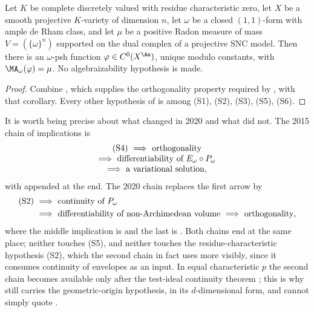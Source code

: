 \begin{corollary}
\label{cor:ch29-bggjkm-cy}
Let \(K\) be complete discretely valued with residue characteristic zero,
let \(X\) be a smooth projective \(K\)-variety of dimension \(n\), let
\(\omega\) be a closed \((1,1)\)-form with ample de Rham class, and let
\(\mu\) be a positive Radon measure of mass \(V=(\{\omega\}^n)\) supported
on the dual complex of a projective SNC model.  Then there is an
\(\omega\)-psh function \(\varphi\in C^0(X^{\An})\), unique modulo
constants, with \(\MA_\omega(\varphi)=\mu\).  No algebraizability
hypothesis is made.
\end{corollary}

\begin{proof}
Combine , which supplies the
orthogonality property required by
, with that corollary.  Every
other hypothesis of  is among
\textup{(S1)}, \textup{(S2)}, \textup{(S3)}, \textup{(S5)},
\textup{(S6)}.
\end{proof}

\begin{remark}
\label{rem:ch29-2020-improvement}
It is worth being precise about what changed in 2020 and what did not.  The
2015 chain of implications is
\[
 \begin{gathered}
 \textup{(S4)}\ \Longrightarrow\ \text{orthogonality}\\[-1mm]
 \Longrightarrow\ \text{differentiability of }E_\omega\circ P_\omega\\[-1mm]
 \Longrightarrow\ \text{a variational solution},
 \end{gathered}
\]
with  appended at the end.  The 2020
chain replaces the first arrow by
\[
\begin{aligned}
 \textup{(S2)}\ &\Longrightarrow\ \text{continuity of }P_\omega\\
 &\Longrightarrow\ \text{differentiability of non-Archimedean volume}
 \ \Longrightarrow\ \text{orthogonality},
\end{aligned}
\]
where the middle implication is
\cite[Theorem~6.3.2]{BGGJKM20} and the last is
\cite[Theorem~6.3.3]{BGGJKM20}.  Both chains end at the same place; neither
touches \textup{(S5)}, and neither touches the residue-characteristic
hypothesis \textup{(S2)}, which the second chain in fact uses more visibly,
since it consumes continuity of envelopes as an input.  In equal
characteristic \(p\) the second chain becomes available only after the
test-ideal continuity theorem
; this is why
 still carries the geometric-origin
hypothesis, in its \(d\)-dimensional form, and cannot simply quote
.
\end{remark}

